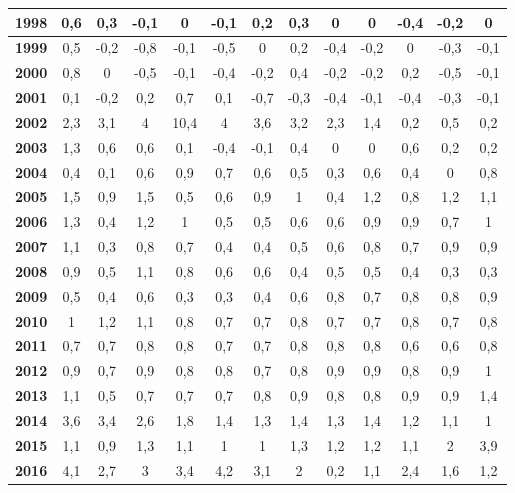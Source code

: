 \begin{center}
\begin{scriptsize}
\begin{longtable}{|c|c|c|c|c|c|c|c|c|c|c|c|c|}
\hline 
\textbf{1998} & 0,6 & 0,3 & -0,1 & 0 & -0,1 & 0,2 & 0,3 & 0 & 0 & -0,4 & -0,2 & 0  \\ 
\hline 
\textbf{1999} & 0,5 & -0,2 & -0,8 & -0,1 & -0,5 & 0 & 0,2 & -0,4 & -0,2 & 0 & -0,3 & -0,1  \\ 
\hline 
\textbf{2000} & 0,8 & 0 & -0,5 & -0,1 & -0,4 & -0,2 & 0,4 & -0,2 & -0,2 & 0,2 & -0,5 & -0,1  \\ 
\hline 
\textbf{2001} & 0,1 & -0,2 & 0,2 & 0,7 & 0,1 & -0,7 & -0,3 & -0,4 & -0,1 & -0,4 & -0,3 & -0,1  \\ 
\hline 
\textbf{2002} & 2,3 & 3,1 & 4 & 10,4 & 4 & 3,6 & 3,2 & 2,3 & 1,4 & 0,2 & 0,5 & 0,2  \\ 
\hline 
\textbf{2003} & 1,3 & 0,6 & 0,6 & 0,1 & -0,4 & -0,1 & 0,4 & 0 & 0 & 0,6 & 0,2 & 0,2  \\ 
\hline 
\textbf{2004} & 0,4 & 0,1 & 0,6 & 0,9 & 0,7 & 0,6 & 0,5 & 0,3 & 0,6 & 0,4 & 0 & 0,8  \\ 
\hline 
\textbf{2005} & 1,5 & 0,9 & 1,5 & 0,5 & 0,6 & 0,9 & 1 & 0,4 & 1,2 & 0,8 & 1,2 & 1,1  \\ 
\hline 
\textbf{2006} & 1,3 & 0,4 & 1,2 & 1 & 0,5 & 0,5 & 0,6 & 0,6 & 0,9 & 0,9 & 0,7 & 1  \\ 
\hline 
\textbf{2007} & 1,1 & 0,3 & 0,8 & 0,7 & 0,4 & 0,4 & 0,5 & 0,6 & 0,8 & 0,7 & 0,9 & 0,9  \\ 
\hline 
\textbf{2008} & 0,9 & 0,5 & 1,1 & 0,8 & 0,6 & 0,6 & 0,4 & 0,5 & 0,5 & 0,4 & 0,3 & 0,3  \\ 
\hline 
\textbf{2009} & 0,5 & 0,4 & 0,6 & 0,3 & 0,3 & 0,4 & 0,6 & 0,8 & 0,7 & 0,8 & 0,8 & 0,9  \\ 
\hline 
\textbf{2010} & 1 & 1,2 & 1,1 & 0,8 & 0,7 & 0,7 & 0,8 & 0,7 & 0,7 & 0,8 & 0,7 & 0,8  \\ 
\hline 
\textbf{2011} & 0,7 & 0,7 & 0,8 & 0,8 & 0,7 & 0,7 & 0,8 & 0,8 & 0,8 & 0,6 & 0,6 & 0,8  \\ 
\hline 
\textbf{2012} & 0,9 & 0,7 & 0,9 & 0,8 & 0,8 & 0,7 & 0,8 & 0,9 & 0,9 & 0,8 & 0,9 & 1  \\ 
\hline 
\textbf{2013} & 1,1 & 0,5 & 0,7 & 0,7 & 0,7 & 0,8 & 0,9 & 0,8 & 0,8 & 0,9 & 0,9 & 1,4  \\ 
\hline 
\textbf{2014} & 3,6 & 3,4 & 2,6 & 1,8 & 1,4 & 1,3 & 1,4 & 1,3 & 1,4 & 1,2 & 1,1 & 1  \\ 
\hline 
\textbf{2015} & 1,1 & 0,9 & 1,3 & 1,1 & 1 & 1 & 1,3 & 1,2 & 1,2 & 1,1 & 2 & 3,9  \\ 
\hline 
\textbf{2016} & 4,1 & 2,7 & 3 & 3,4 & 4,2 & 3,1 & 2 & 0,2 & 1,1 & 2,4 & 1,6 & 1,2  \\ 

\end{longtable}
\end{scriptsize}
\end{center}
